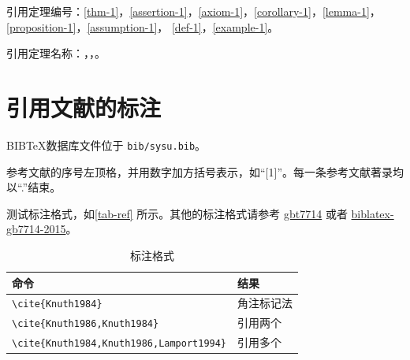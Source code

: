 引用定理编号：\autoref{thm-1}，\autoref{assertion-1}，\autoref{axiom-1}，\autoref{corollary-1}，\autoref{lemma-1}，\autoref{proposition-1}，\autoref{assumption-1}， \autoref{def-1}，\autoref{example-1}。

引用定理名称：，，。

\section{引用文献的标注}

BIB\TeX 数据库文件位于 \verb|bib/sysu.bib|。

参考文献的序号左顶格，并用数字加方括号表示，如“[1]”。每一条参考文献著录均以“.”结束。

测试标注格式，如\autoref{tab-ref} 所示。其他的标注格式请参考 \href{http://mirrors.ctan.org/biblio/bibtex/contrib/gbt7714/gbt7714.pdf}{gbt7714} 或者
\href{http://mirrors.ctan.org/macros/latex/contrib/biblatex-contrib/biblatex-gb7714-2015/biblatex-gb7714-2015.pdf}{biblatex-gb7714-2015}。

\begin{table}[H]
	\centering
	\caption{标注格式}
	\label{tab-ref}
	\begin{tabular}{ll}
		\toprule
		命令                                            & 结果                                         \\
		\midrule
		\verb|\cite{Knuth1984}|                       & 角注标记法\cite{Knuth1984}                      \\
		\verb|\cite{Knuth1986,Knuth1984}|             & 引用两个\cite{Knuth1986,Knuth1984}             \\
		\verb|\cite{Knuth1984,Knuth1986,Lamport1994}| & 引用多个\cite{Knuth1984,Knuth1986,Lamport1994} \\
		\bottomrule
	\end{tabular}
\end{table}
